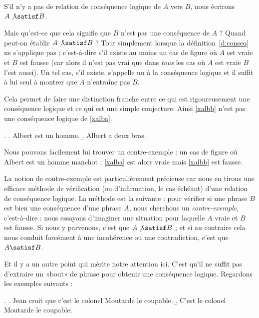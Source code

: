 \begin{refsegment}
\begin{nota}
S'il n'y a pas de relation de conséquence logique de $A$ vers
$B$, nous écrirons $A \not\satisf B$.
\end{nota}



Mais qu'est-ce que cela signifie que $B$ n'est pas une conséquence
de $A$ ?  Quand peut-on établir $A \not\satisf B$ ? Tout simplement
lorsque la définition~\ref{d:conseq} ne s'applique pas ; c'est-à-dire
s'il existe au moins un cas de figure où $A$ est vraie et $B$ est fausse
(car alors il n'est pas vrai que dans \emph{tous} les cas où $A$ est vraie
$B$ l'est aussi).  Un tel cas, s'il existe,  s'appelle un
 à la conséquence logique et il suffit à lui seul à
montrer que $A$ n'entraîne pas $B$.

Cela permet de faire une distinction franche entre ce qui est
rigoureusement une conséquence logique et ce qui est une simple
conjecture.  Ainsi \ref{xalbb} n'est pas une conséquence logique de
\ref{xalba}. 

\ex.\label{xalb}
\a. Albert est un homme. \label{xalba}
\b. Albert a deux bras. \label{xalbb}

Nous pouvons facilement lui  trouver un contre-exemple :  un cas de
figure où Albert est un homme manchot ; \ref{xalba} est alors vraie mais
\ref{xalbb} est fausse.  



La notion de contre-exemple est particulièrement précieuse car nous en
tirons une efficace méthode  de vérification (ou d'infirmation, le cas
échéant) d'une 
relation de conséquence logique.\label{p.contrex} %
La méthode est la suivante :  pour vérifier si une phrase $B$ est bien une
conséquence d'une phrase $A$, nous cherchons un \emph{contre-exemple},
c'est-à-dire : nous essayons d'imaginer une situation pour laquelle $A$ vraie et $B$ est fausse. Si nous y parvenons, c'est que $A\not\satisf B$  ; et si au contraire cela nous conduit forcément à une incohérence ou une contradiction, c'est que $A \satisf B$.

Et il y a un autre point qui mérite notre attention ici.  C'est qu'il
ne suffit pas d'extraire un «bout» de phrase pour obtenir une
conséquence logique.  Regardons les exemples suivants :

\ex. \label{x:celmout}
\a. Jean croit que c'est le colonel Moutarde le coupable. \label{x:celmouta} 
\b. C'est le colonel Moutarde le coupable. \label{x:celmoutb}


\end{refsegment}
